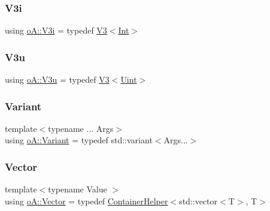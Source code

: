 \mbox{\label{namespaceo_a_a1b5e3fb31926401708aa4000145a58ef}} 
\subsubsection{\texorpdfstring{V3i}{V3i}}
{\footnotesize\ttfamily using \mbox{\hyperlink{namespaceo_a_a1b5e3fb31926401708aa4000145a58ef}{o\+A\+::\+V3i}} = typedef \mbox{\hyperlink{structo_a_1_1_v3}{V3}}$<$\mbox{\hyperlink{namespaceo_a_aa575525a7b0116822c73d43fa671a58c}{Int}}$>$}

\mbox{\label{namespaceo_a_ae91b6ba950b8f72e43ee17b69dbfeaad}} 
\subsubsection{\texorpdfstring{V3u}{V3u}}
{\footnotesize\ttfamily using \mbox{\hyperlink{namespaceo_a_ae91b6ba950b8f72e43ee17b69dbfeaad}{o\+A\+::\+V3u}} = typedef \mbox{\hyperlink{structo_a_1_1_v3}{V3}}$<$\mbox{\hyperlink{namespaceo_a_abe1d8250226c5cf34f84d7b75fc7922e}{Uint}}$>$}

\mbox{\label{namespaceo_a_a46a1498e4e673b19327a24fac0018867}} 
\subsubsection{\texorpdfstring{Variant}{Variant}}
{\footnotesize\ttfamily template$<$typename ... Args$>$ \\
using \mbox{\hyperlink{namespaceo_a_a46a1498e4e673b19327a24fac0018867}{o\+A\+::\+Variant}} = typedef std\+::variant$<$Args...$>$}

\mbox{\label{namespaceo_a_aead0f530bdad1c2e668426680b26017f}} 
\subsubsection{\texorpdfstring{Vector}{Vector}}
{\footnotesize\ttfamily template$<$typename Value $>$ \\
using \mbox{\hyperlink{namespaceo_a_aead0f530bdad1c2e668426680b26017f}{o\+A\+::\+Vector}} = typedef \mbox{\hyperlink{classo_a_1_1_container_helper}{Container\+Helper}}$<$std\+::vector$<$T$>$, T$>$}



